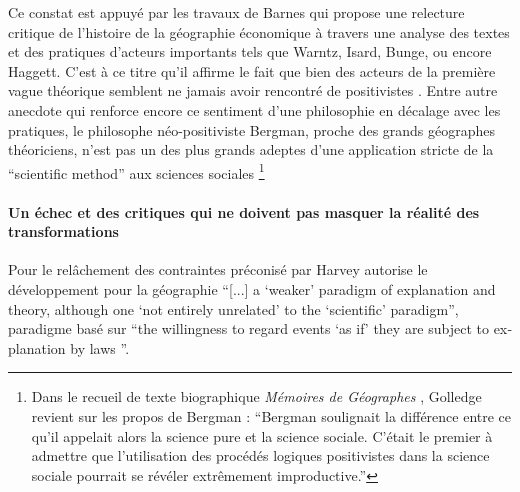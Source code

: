 

Ce constat est appuyé par les travaux de Barnes qui propose une relecture critique de l'histoire de la géographie économique \autocite[122]{Barnes1996} à travers une analyse des textes et des pratiques d'acteurs importants tels que Warntz, Isard, Bunge, ou encore Haggett. C'est à ce titre qu'il affirme \autocite{Barnes2001a} le fait que bien des acteurs de la première vague théorique semblent ne jamais avoir rencontré de positivistes \autocite{Morrill1993}. Entre autre anecdote qui renforce encore ce sentiment d'une philosophie en décalage avec les pratiques, le philosophe néo-positiviste Bergman, proche des grands géographes théoriciens, n'est pas un des plus grands adeptes d'une application stricte de la \foreignquote{english}{scientific method} aux sciences sociales \footnote{Dans le recueil de texte biographique \textit{Mémoires de Géographes} \textcite[96]{Bailly2000}, Golledge revient sur les propos de Bergman : \enquote{Bergman soulignait la différence entre ce qu'il appelait alors la science pure et la science sociale. C'était le premier à admettre que l'utilisation des procédés logiques positivistes dans la science sociale pourrait se révéler extrêmement improductive.} }

\paragraph{Un échec et des critiques qui ne doivent pas masquer la réalité des transformations}
\label{p:echec_critiques}


Pour \textcite[41]{Gregory1978} le relâchement des contraintes préconisé par Harvey \autocite[47]{Paterson1984} autorise le développement pour la géographie \foreignquote{english}{[...] a \enquote{weaker} paradigm of explanation and theory, although one \enquote{not entirely unrelated} to the \enquote{scientific} paradigm}, paradigme basé sur \foreignquote{english}{the willingness to regard events \enquote{as if} they are subject to explanation by laws \autocite[174]{Harvey1969}}.

